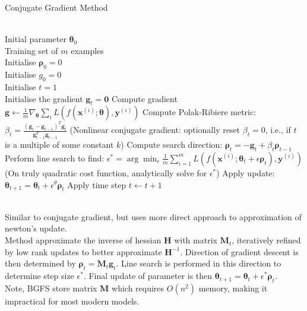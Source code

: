 \begin{breakablealgorithm}
\caption{Conjugate Gradient Method}
\begin{algorithmic}
\Require \\
Initial parameter $\bm{\theta}_0$\\
Training set of $m$ examples\\
Initialise $\bm{\rho}_0 = 0$\\
Initialise $g_0 = 0$\\
Initialise $t = 1$\\

\State Initialise the gradient $\bm{g}_t = \bm{0}$
\State Compute gradient $\bm{g} \leftarrow \frac{1}{m} \nabla_{\bm{\theta}} \sum_i L(f(\bm{x}^{(i)}; \bm{\theta}), \bm{y}^{(i)})$
\State Compute Polak-Ribiere metric: $\beta_t = \frac{(\bm{g}_t - \bm{g}_{t-1})^T \bm{g}_t}{\bm{g}_{t-1}^T \bm{g}_{t-1}}$
\State (Nonlinear conjugate gradient: optionally reset $\beta_t = 0$, i.e., if $t$ is a multiple of some constant $k$)
\State Compute search direction: $\bm{\rho}_t = -\bm{g}_t + \beta_t \bm{\rho}_{t-1}$
\State Perform line search to find: $\epsilon^{*} = \arg \min_{\epsilon} \frac{1}{m} \sum_{i=1}^m L(f(\bm{x}^{(i)}; \bm{\theta}_t + \epsilon \bm{\rho}_t), \bm{y}^{(i)})$
\State (On truly quadratic cost function, analytically solve for $\epsilon^{*}$)
\State Apply update: $\bm{\theta}_{t+1} = \bm{\theta}_{t} + \epsilon^{\theta} \bm{\rho}_t$
\State Apply time step $t \leftarrow t + 1$
\EndWhile
\end{algorithmic}
\end{breakablealgorithm}

\begin{remark} \\
Similar to conjugate gradient, but uses more direct approach to approximation of newton's update.\\
Method approximate the inverse of hessian $\bm{H}$ with matrix $\bm{M}_t$, iteratively refined by low rank updates to better approximate $\bm{H}^{-1}$. Direction of gradient descent is then determined by $\bm{\rho}_t = \bm{M}_t \bm{g}_t$. Line search is performed in this direction to determine step size $\epsilon^{*}$. Final update of parameter is then $\bm{\theta}_{t+1} = \bm{\theta}_t + \epsilon^{*} \bm{\rho}_{t}$.\\
Note, BGFS store matrix $\bm{M}$ which requires $O(n^2)$ memory, making it impractical for most modern models.
\end{remark}
